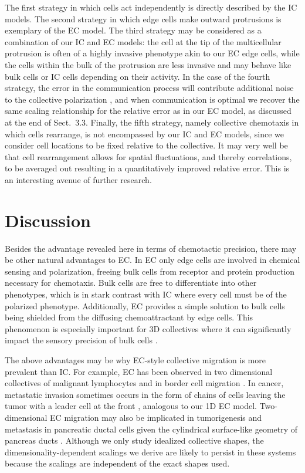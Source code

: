 The first strategy in which cells act independently is directly described by the IC models. The second strategy in which edge cells make outward protrusions is exemplary of the EC model. The third strategy may be considered as a combination of our IC and EC models: the cell at the tip of the multicellular protrusion is often of a highly invasive phenotype akin to our EC edge cells, while the cells within the bulk of the protrusion are less invasive and may behave like bulk cells or IC cells depending on their activity. In the case of the fourth strategy, the error in the communication process will contribute additional noise to the collective polarization \cite{mugler2016limits}, and when communication is optimal we recover the same scaling relationship for the relative error as in our EC model, as discussed at the end of Sect.\ 3.3. Finally, the fifth strategy, namely collective chemotaxis in which cells rearrange, is not encompassed by our IC and EC models, since we consider cell locations to be fixed relative to the collective. It may very well be that cell rearrangement allows for spatial fluctuations, and thereby correlations, to be averaged out resulting in a quantitatively improved relative error. This is an interesting avenue of further research.

\section{Discussion}

Besides the advantage revealed here in terms of chemotactic precision, there may be other natural advantages to EC. In EC only edge cells are involved in chemical sensing and polarization, freeing bulk cells from receptor and protein production necessary for chemotaxis. Bulk cells are free to differentiate into other phenotypes, which is in stark contrast with IC where every cell must be of the polarized phenotype. Additionally, EC provides a simple solution to bulk cells being shielded from the diffusing chemoattractant by edge cells. This phenomenon is especially important for 3D collectives where it can significantly impact the sensory precision of bulk cells \cite{smith2016role}.

The above advantages may be why EC-style collective migration is more prevalent than IC. For example, EC has been observed in two dimensional collectives of malignant lymphocytes \cite{malet2015collective} and in border cell migration \cite{cai2016modeling}. In cancer, metastatic invasion sometimes occurs in the form of chains of cells leaving the tumor with a leader cell at the front \cite{cheung2013collective,friedl2009collective}, analogous to our 1D EC model. Two-dimensional EC migration may also be implicated in tumorigenesis and metastasis in pancreatic ductal cells given the cylindrical surface-like geometry of pancreas ducts
\cite{bardeesy2002pancreatic}. Although we only study idealized collective shapes, the dimensionality-dependent scalings we derive are likely to persist in these systems because the scalings are independent of the exact shapes used.

